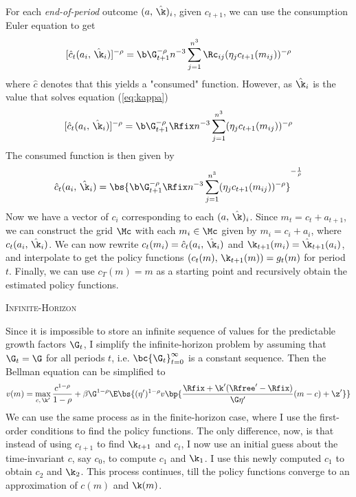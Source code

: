 For each \textit{end-of-period} outcome $(a,\,\hat{\k})_i$, given $c_{t+1}$, we can use the consumption Euler equation to get
\[
[\hat{c}_t(a_i,\,\hat{\k}_i)]^{-\rho} = \b\G_{t+1}^{-\rho} n^{-3}\sum_{j=1}^{n^3}\Rc_{ij}(\eta_{j}c_{t+1}(m_{ij}))^{-\rho}
\]
where $\hat{c}$ denotes that this yields a "consumed" function. However, as $\hat{\k}_{i}$ is the value that solves equation (\ref{eq:kappa})
\[
[\hat{c}_{t}(a_i,\,\hat{\k}_i)]^{-\rho} = \b\G_{t+1}^{-\rho}\Rfix n^{-3}\sum_{j=1}^{n^3}(\eta_{j}c_{t+1}(m_{ij}))^{-\rho}
\]
The consumed function is then given by
\[
\hat{c}_{t}(a_i,\,\hat{\k}_i) = \bs{\b\G_{t+1}^{-\rho}\Rfix n^{-3}\sum_{j=1}^{n^3}(\eta_{j}c_{t+1}(m_{ij}))^{-\rho}}^{-\frac{1}{\rho}}
\]
Now we have a vector of $c_i$ corresponding to each $(a,\,\hat{\k})_i$. Since $m_{t} = c_{t} + a_{t+1}$, we can construct the grid $\Mc$ with each $m_i \in \Mc$ given by $m_i = c_i + a_i$, where $c_{t}(a_i,\,\hat{\k}_i)$. We can now rewrite $c_t(m_i) = \hat{c}_t(a_i,\,\hat{\k}_i)$ and $\k_{t+1}(m_i) = \hat{\k}_{t+1}(a_i)$, and interpolate to get the policy functions $(c_{t}(m),\,\k_{t+1}(m)) = g_{t}(m)$ for period $t$. Finally, we can use $c_{T}(m) = m$ as a starting point and recursively obtain the estimated policy functions.

\textsc{Infinite-Horizon}

Since it is impossible to store an infinite sequence of values for the predictable growth factors $\G_{t}$, I simplify the infinite-horizon problem by assuming that $\G_{t} = \G$ for all periods $t$, i.e. $\bc{\G_{t}}_{t=0}^{\infty}$ is a constant sequence. Then the Bellman equation can be simplified to
\[
v(m) = \max_{c,\,\k'}\frac{c^{1-\rho}}{1-\rho} + \beta\G^{1-\rho} \E\bs{(\eta')^{1-\rho}v\bp{\frac{\Rfix + \k'(\Rfree' - \Rfix)}{\G\eta'}(m - c) + \z'}}
\]
We can use the same process as in the finite-horizon case, where I use the first-order conditions to find the policy functions. The only difference, now, is that instead of using $c_{t+1}$ to find $\k_{t+1}$ and $c_{t}$, I now use an initial guess about the time-invariant $c$, say $c_{0}$, to compute $c_{1}$ and $\k_1$. I use this newly computed $c_1$ to obtain $c_2$ and $\k_2$. This process continues, till the policy functions converge to an approximation of $c(m)$ and $\k(m)$.



